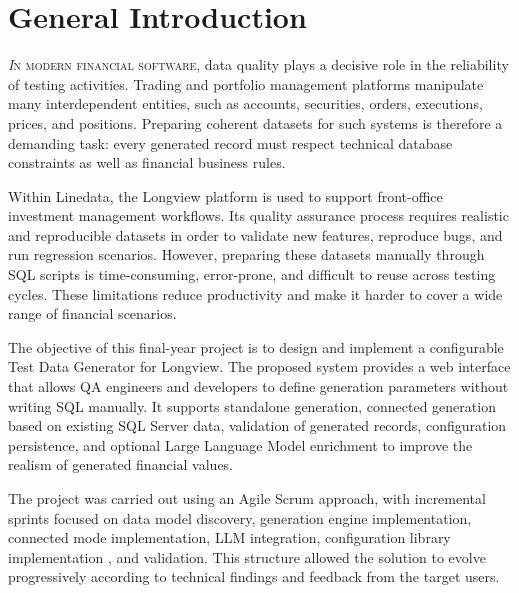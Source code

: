 \chapter*{General Introduction}

\lettrine[]{\textit{I}}{n modern financial software}, data quality plays a decisive role in the reliability of testing activities. Trading and portfolio management platforms manipulate many interdependent entities, such as accounts, securities, orders, executions, prices, and positions. Preparing coherent datasets for such systems is therefore a demanding task: every generated record must respect technical database constraints as well as financial business rules.

Within Linedata, the Longview platform is used to support front-office investment management workflows. Its quality assurance process requires realistic and reproducible datasets in order to validate new features, reproduce bugs, and run regression scenarios. However, preparing these datasets manually through SQL scripts is time-consuming, error-prone, and difficult to reuse across testing cycles. These limitations reduce productivity and make it harder to cover a wide range of financial scenarios.

The objective of this final-year project is to design and implement a configurable Test Data Generator for Longview. The proposed system provides a web interface that allows QA engineers and developers to define generation parameters without writing SQL manually. It supports standalone generation, connected generation based on existing SQL Server data, validation of generated records, configuration persistence, and optional Large Language Model enrichment to improve the realism of generated financial values.

The project was carried out using an Agile Scrum approach, with incremental sprints focused on data model discovery, generation engine implementation, connected mode implementation, LLM integration, configuration library implementation , and validation. This structure allowed the solution to evolve progressively according to technical findings and feedback from the target users.

